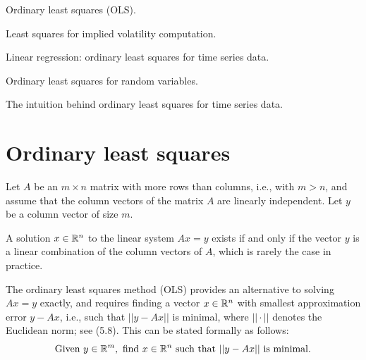 
\noindent Ordinary least squares (OLS).
\medskip

\noindent Least squares for implied volatility computation.
\medskip

\noindent Linear regression: ordinary least squares for time series data.
\medskip

\noindent Ordinary least squares for random variables.
\medskip

\noindent The intuition behind ordinary least squares for time series data.
\medskip

\section{Ordinary least squares}

Let $A$ be an $m \times n$ matrix with more rows than columns, i.e., with $m > n$, and
assume that the column vectors of the matrix $A$ are linearly independent. Let $y$ be
a column vector of size $m$.

A solution $x \in \mathbb{R}^n$ to the linear system $Ax = y$ exists if and only if the vector
$y$ is a linear combination of the column vectors of $A$, which is rarely the case in
practice.

The ordinary least squares method (OLS) provides an alternative to solving $Ax = y$
exactly, and requires finding a vector $x \in \mathbb{R}^n$ with smallest approximation error
$y - Ax$, i.e., such that $||y - Ax||$ is minimal, where $||\cdot||$ denotes the
Euclidean norm; see (5.8). This can be stated formally as follows:
\begin{equation}
\text{Given } y \in \mathbb{R}^m, \text{ find } x \in \mathbb{R}^n \text{ such that } ||y - Ax|| \text{
is minimal.}
\end{equation}

